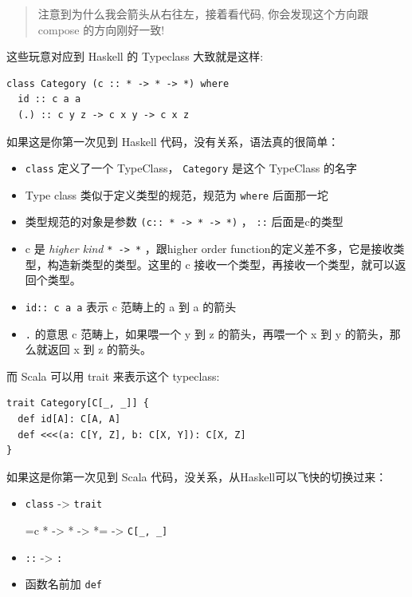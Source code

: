 \documentclass[letterspacing]{tufte-book}
\begin{document}
\begin{quote}
注意到为什么我会箭头从右往左，接着看代码, 你会发现这个方向跟 compose 的方向刚好一致!
\end{quote}

这些玩意对应到 Haskell 的 Typeclass 大致就是这样:

\begin{lstlisting}
class Category (c :: * -> * -> *) where
  id :: c a a
  (.) :: c y z -> c x y -> c x z
\end{lstlisting}

如果这是你第一次见到 Haskell 代码，没有关系，语法真的很简单：
\begin{itemize}
\item \texttt{class} 定义了一个 TypeClass， \texttt{Category} 是这个 TypeClass 的名字
\item Type class 类似于定义类型的规范，规范为 \texttt{where} 后面那一坨
\item 类型规范的对象是参数 \texttt{(c:: * -> * -> *)} ， \texttt{::} 后面是c的类型
\item c 是 \emph{higher kind} \texttt{* -> *} ，跟higher order function的定义差不多，它是接收类型，构造新类型的类型。这里的 c 接收一个类型，再接收一个类型，就可以返回个类型。
\end{itemize}
\begin{itemize}
\item \texttt{id:: c a a} 表示 c 范畴上的 a 到 a 的箭头
\item \texttt{.} 的意思 c 范畴上，如果喂一个 y 到 z 的箭头，再喂一个 x 到 y 的箭头，那么就返回 x 到 z 的箭头。
\end{itemize}

而 Scala 可以用 trait 来表示这个 typeclass:
\begin{lstlisting}
trait Category[C[_, _]] {
  def id[A]: C[A, A]
  def <<<(a: C[Y, Z], b: C[X, Y]): C[X, Z] 
}
\end{lstlisting}

如果这是你第一次见到 Scala 代码，没关系，从Haskell可以飞快的切换过来：
\begin{itemize}
\item \texttt{class} -> \texttt{trait}
\item[{=c}] * -> * -> *= -> \texttt{C[\_, \_]}
\item \texttt{::} -> \texttt{:}
\item 函数名前加 \texttt{def}
\end{itemize}
\end{document}
